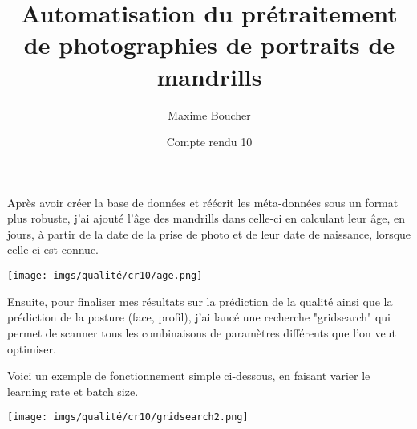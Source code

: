 \documentclass{article}
\title{Automatisation du prétraitement de photographies de portraits de mandrills}
\author{Maxime Boucher}
\date{Compte rendu 10}
\begin{document}
\maketitle

Après avoir créer la base de données et réécrit les méta-données sous un format plus robuste, j'ai ajouté l'âge des mandrills dans celle-ci en calculant leur âge, en jours, à partir de la date de la prise de photo et de leur date de naissance, lorsque celle-ci est connue.

\begin{center}
    \texttt{[image: imgs/qualité/cr10/age.png]}
\end{center}

Ensuite, pour finaliser mes résultats sur la prédiction de la qualité ainsi que la prédiction de la posture (face, profil), j'ai lancé une recherche "gridsearch" qui permet de scanner tous les combinaisons de paramètres différents que l'on veut optimiser.

Voici un exemple de fonctionnement simple ci-dessous, en faisant varier le learning rate et batch size.
\begin{center}
    \texttt{[image: imgs/qualité/cr10/gridsearch2.png]}
\end{center}
\end{document}
